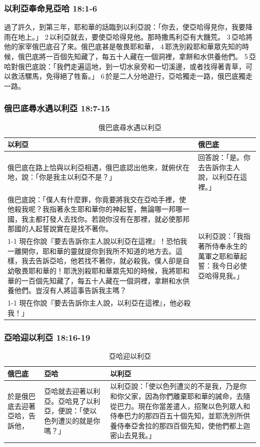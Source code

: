 \subsubsection{以利亞奉命見亞哈 18:1-6} 
過了許久，到第三年，耶和華的話臨到以利亞說：「你去，使亞哈得見你，我要降雨在地上。」 2 以利亞就去，要使亞哈得見他。那時撒馬利亞有大饑荒。 3 亞哈將他的家宰俄巴底召了來。俄巴底甚是敬畏耶和華， 4 耶洗別殺耶和華眾先知的時候，俄巴底將一百個先知藏了，每五十人藏在一個洞裡，拿餅和水供養他們。 5 亞哈對俄巴底說：「我們走遍這地，到一切水泉旁和一切溪邊，或者找得著青草，可以救活騾馬，免得絕了牲畜。」 6 於是二人分地遊行，亞哈獨走一路，俄巴底獨走一路。

\subsubsection{俄巴底尋水遇以利亞 18:7-15} 
\begin{table}[H]
\centering 
\begin{tabular}{p{13cm}|p{}}\hline\hline
以利亞&俄巴底\\\hline
俄巴底在路上恰與以利亞相遇，俄巴底認出他來，就俯伏在地，說：「你是我主以利亞不是？」&回答說：「是。你去告訴你主人說，以利亞在這裡。」\\\hline
俄巴底說：「僕人有什麼罪，你竟要將我交在亞哈手裡，使他殺我呢？我指著永生耶和華你的神起誓，無論哪一邦哪一國，我主都打發人去找你。若說你沒有在那裡，就必使那邦那國的人起誓說實在是找不著你。&\multirow{3}{4.cm}{以利亞說：「我指著所侍奉永生的萬軍之耶和華起誓：我今日必使亞哈得見我。」}\\\cline{1-1}
現在你說『要去告訴你主人說以利亞在這裡』！恐怕我一離開你，耶和華的靈就提你到我所不知道的地方去。這樣，我去告訴亞哈，他若找不著你，就必殺我。僕人卻是自幼敬畏耶和華的！耶洗別殺耶和華眾先知的時候，我將耶和華的一百個先知藏了，每五十人藏在一個洞裡，拿餅和水供養他們。豈沒有人將這事告訴我主嗎？&\\\cline{1-1}
現在你說『要去告訴你主人說，以利亞在這裡』，他必殺我！」&\\\hline
\end{tabular}
\caption{俄巴底尋水遇以利亞}
\end{table}


\subsubsection{亞哈迎以利亞 18:16-19} 
\begin{table}[H]
\centering 
\begin{tabular}{p{2cm}|p{}|p{}}\hline\hline
俄巴底&亞哈&以利亞\\\hline
於是俄巴底去迎著亞哈，告訴他，&亞哈就去迎著以利亞。亞哈見了以利亞，便說：「使以色列遭災的就是你嗎？」&以利亞說：「使以色列遭災的不是我，乃是你和你父家，因為你們離棄耶和華的誡命，去隨從巴力。現在你當差遣人，招聚以色列眾人和侍奉巴力的那四百五十個先知，並耶洗別所供養侍奉亞舍拉的那四百個先知，使他們都上迦密山去見我。」\\\hline
\end{tabular}
\caption{亞哈迎以利亞}
\end{table}

